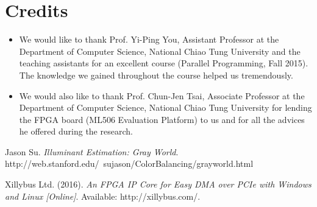 \documentclass{acm_proc_article-sp}
\begin{document}
\section{Credits}
\begin{itemize}
\item We would like to thank Prof. Yi-Ping You, Assistant Professor at the Department of Computer Science, National Chiao Tung University and the teaching assistants for an excellent course (Parallel Programming, Fall 2015). The knowledge we gained throughout the course helped us tremendously.
\item We would also like to thank Prof. Chun-Jen Tsai, Associate Professor at the Department of Computer Science, National Chiao Tung University for lending the FPGA board (ML506 Evaluation Platform) to us and for all the advices he offered during the research.
\end{itemize}

\begin{thebibliography}{9}
Jason Su.
\textit{Illuminant Estimation: Gray World}. 
http://web.stanford.edu/~sujason/ColorBalancing/grayworld.html

Xillybus Ltd. (2016).
\textit{An FPGA IP Core for Easy DMA over PCIe with Windows and Linux [Online]}. 
Available: http://xillybus.com/.
\end{thebibliography}
\end{document}
